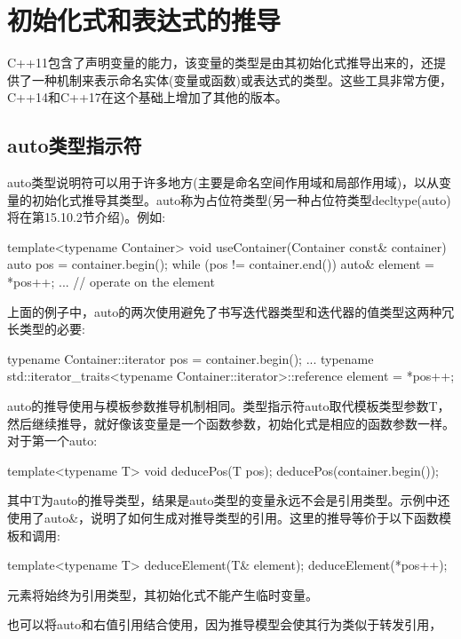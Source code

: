 \section{初始化式和表达式的推导}

C++11包含了声明变量的能力，该变量的类型是由其初始化式推导出来的，还提供了一种机制来表示命名实体(变量或函数)或表达式的类型。这些工具非常方便，C++14和C++17在这个基础上增加了其他的版本。

\subsection{auto类型指示符}

auto类型说明符可以用于许多地方(主要是命名空间作用域和局部作用域)，以从变量的初始化式推导其类型。auto称为占位符类型(另一种占位符类型decltype(auto)将在第15.10.2节介绍)。例如:

\begin{cpp}
template<typename Container>
void useContainer(Container const& container)
{
	auto pos = container.begin();
	while (pos != container.end()) {
		auto& element = *pos++;
		... // operate on the element
	}
}
\end{cpp}

上面的例子中，auto的两次使用避免了书写迭代器类型和迭代器的值类型这两种冗长类型的必要:

\begin{cpp}
typename Container::iterator pos = container.begin();
...
typename std::iterator_traits<typename Container::iterator>::reference
	element = *pos++;
\end{cpp}

auto的推导使用与模板参数推导机制相同。类型指示符auto取代模板类型参数T，然后继续推导，就好像该变量是一个函数参数，初始化式是相应的函数参数一样。对于第一个auto:

\begin{cpp}
template<typename T> void deducePos(T pos);
deducePos(container.begin());
\end{cpp}

其中T为auto的推导类型，结果是auto类型的变量永远不会是引用类型。示例中还使用了auto\&，说明了如何生成对推导类型的引用。这里的推导等价于以下函数模板和调用:

\begin{cpp}
template<typename T> deduceElement(T& element);
deduceElement(*pos++);
\end{cpp}

元素将始终为引用类型，其初始化式不能产生临时变量。

也可以将auto和右值引用结合使用，因为推导模型会使其行为类似于转发引用，

